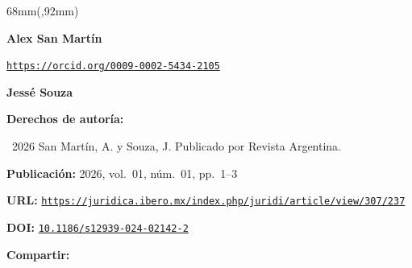 \documentclass{article}
\newlength{\gbbloquex}
\begin{document}
\begin{textblock*}{68mm}(\gbbloquex,92mm)
{\setlength{\leftskip}{0pt}\setlength{\parindent}{0pt}%
\noindent\begin{minipage}[t]{68mm}
\sffamily\small\setlength{\parskip}{1pt}
{\bfseries\color{azulrevista}Alex San Martín}\par
{\scriptsize\texttt{\href{https://orcid.org/0009-0002-5434-2105}{https://orcid.org/0009-0002-5434-2105}}}\par
\vspace{4pt}
{\bfseries\color{azulrevista}Jessé Souza}\par
\vspace{6pt}
{\bfseries\color{azulrevista!70}Derechos de autor\'ia:}\par
\textcopyright\ 2026 San Martín, A. y Souza, J. Publicado por Revista Argentina. \par\vspace{6pt}
{\bfseries\color{azulrevista!70}Publicación:} 2026, vol.~01, n\'um.~01, pp.~1--3\par\vspace{6pt}
{\bfseries\color{azulrevista!70}URL:} {\scriptsize\texttt{\href{https://juridica.ibero.mx/index.php/juridi/article/view/307/237}{https://juridica.ibero.mx/index.php/juridi/article/view/307/237}}}\par\vspace{6pt}
{\bfseries\color{azulrevista!70}DOI:} {\scriptsize\texttt{\href{https://doi.org/10.1186/s12939-024-02142-2}{10.1186/s12939-024-02142-2}}}\par\vspace{6pt}
\vspace{6pt}
{\bfseries\color{azulrevista!70}Compartir:}\par\vspace{3pt}
{\large
\href{https://bsky.app/intent/compose?text=https%3A%2F%2Fjuridica.ibero.mx%2Findex.php%2Fjuridi%2Farticle%2Fview%2F307%2F237}{}~
\href{mailto:?subject=Desigualdad%20digital%20y%20rendimiento%20acad%C3%A9mico%20en%20la%20educaci%C3%B3n%20superior%3A%20un%20estudio%20comparativo%20en%20universidades%20p%C3%BAblicas%20de%20Argentina%20y%20M%C3%A9xico&body=https%3A%2F%2Fjuridica.ibero.mx%2Findex.php%2Fjuridi%2Farticle%2Fview%2F307%2F237}{}~
\href{https://www.facebook.com/sharer/sharer.php?u=https%3A%2F%2Fjuridica.ibero.mx%2Findex.php%2Fjuridi%2Farticle%2Fview%2F307%2F237}{}~
}
\end{minipage}}
\end{textblock*}
\end{document}
